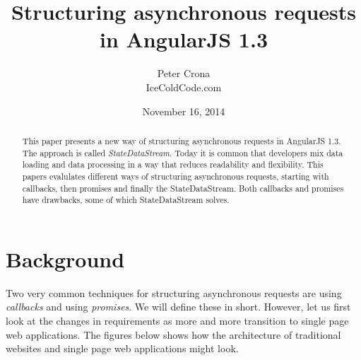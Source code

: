 \documentclass[a4paper,12pt]{article}
\begin{document}
\graphicspath{ {./images/} }

\lstset{
   language=JavaScript,
   extendedchars=true,
   basicstyle=\footnotesize\ttfamily,
   showstringspaces=false,
   showspaces=false,
   numbers=left,
   numberstyle=\footnotesize,
   numbersep=9pt,
   tabsize=2,
   breaklines=true,
   showtabs=false,
   captionpos=b
}

\title{Structuring asynchronous requests in AngularJS 1.3}
\date{November 16, 2014}
\author{Peter Crona\\ IceColdCode.com}
\maketitle

\begin{abstract}
This paper presents a new way of structuring asynchronous requests in AngularJS 1.3. The approach is
called \emph{StateDataStream}. Today it is common that developers mix data loading and data processing in a way that reduces readability and flexibility. 
This papers evalulates different ways of structuring asynchronous requests, starting with callbacks, then promises and finally the StateDataStream.
Both callbacks and promises have drawbacks, some of which StateDataStream solves.
\end{abstract}
\clearpage

\afterpage{\null\newpage}
\clearpage

\tableofcontents
\clearpage

\afterpage{\null\newpage}
\clearpage

\section{Background}
Two very common techniques for structuring asynchronous requests are using \emph{callbacks} and using \emph{promises}.
We will define these in short. However, let us first look at the changes in requirements as more and more transition to single page web applications.
The figures below shows how the architecture of traditional websites and single page web applications might look.
\end{document}
